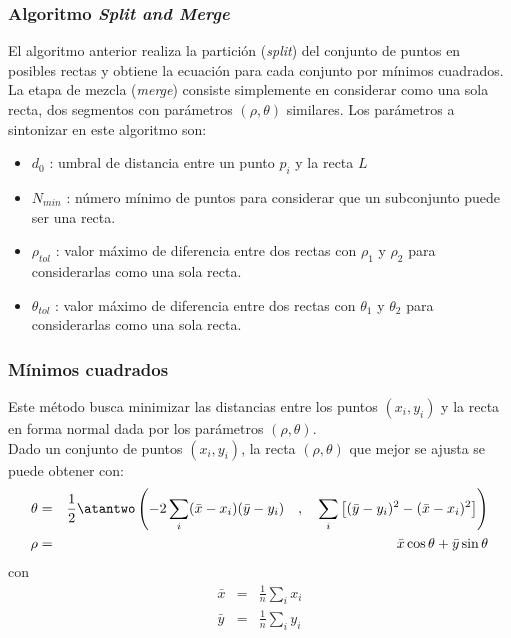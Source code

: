 \begin{frame}\frametitle{Algoritmo \textit{Split and Merge}}
  \label{fr:split_merge}
  El algoritmo anterior realiza la partición (\textit{split}) del conjunto de puntos en posibles rectas y obtiene la ecuación para cada conjunto por mínimos cuadrados. La etapa de mezcla (\textit{merge}) consiste simplemente en considerar como una sola recta, dos segmentos con parámetros $(\rho, \theta)$ similares. Los parámetros a sintonizar en este algoritmo son:
  \begin{itemize}
  \item $d_0$ : umbral de distancia entre un punto $p_i$ y la recta $L$
  \item $N_{min}$ : número mínimo de puntos para considerar que un subconjunto puede ser una recta.
  \item $\rho_{tol}$ : valor máximo de diferencia entre dos rectas con $\rho_1$ y $\rho_2$ para considerarlas como una sola recta.
  \item $\theta_{tol}$ : valor máximo de diferencia entre dos rectas con $\theta_1$ y $\theta_2$ para considerarlas como una sola recta. 
  \end{itemize}
\end{frame}

\begin{frame}\frametitle{Mínimos cuadrados}
  Este método busca minimizar las distancias entre los puntos $(x_i,y_i)$ y la recta en forma normal dada por los parámetros $(\rho, \theta)$.
  \[\]
  Dado un conjunto de puntos $(x_i, y_i)$, la recta $(\rho,\theta)$ que mejor se ajusta se puede obtener con:
  \begin{eqnarray*}
    \theta &=& \frac{1}{2}\atantwo\left(-2\sum_i (\bar{x} - x_i)(\bar{y}-y_i)\quad,\quad \sum_i\left[(\bar{y} - y_i)^2 - (\bar{x} - x_i)^2\right]\right)\\
    \rho &=& \bar{x}\cos\theta + \bar{y}\sin\theta
  \end{eqnarray*}
  con
  \begin{eqnarray*}
    \bar{x} &=& \frac{1}{n}\sum_i x_i\\
    \bar{y} &=& \frac{1}{n}\sum_i y_i
  \end{eqnarray*}
\end{frame}

